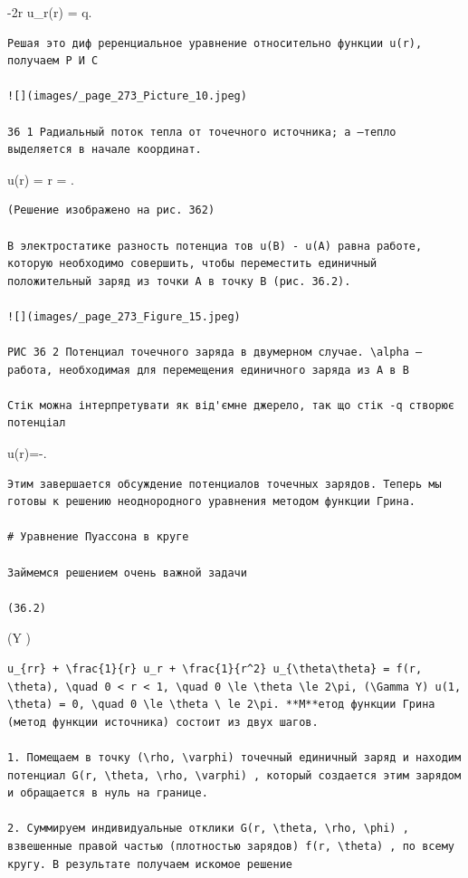 \documentclass[
  ukrainian,
]{article}
\begin{document}
-2\pi r u\_r(r) = q.

\begin{verbatim}
Решая это диф реренциальное уравнение относительно функции u(r), получаем Р И С

![](images/_page_273_Picture_10.jpeg)

36 1 Радиальный поток тепла от точечного источника; a —тепло выделяется в начале координат.
\end{verbatim}

u(r) =  \ln r =  \ln {}.

\begin{verbatim}
(Решение изображено на рис. 362)

В электростатике разность потенциа тов u(B) - u(A) равна работе, которую необходимо совершить, чтобы переместить единичный положительный заряд из точки A в точку B (рис. 36.2).

![](images/_page_273_Figure_15.jpeg)

РИС 36 2 Потенциал точечного заряда в двумерном случае. \alpha — работа, необходимая для перемещения единичного заряда из A в B

Стік можна інтерпретувати як від'ємне джерело, так що стік -q створює потенціал
\end{verbatim}

u\left(r\right)=-\ln{}.

\begin{verbatim}
Этим завершается обсуждение потенциалов точечных зарядов. Теперь мы готовы к решению неоднородного уравнения методом функции Грина.

# Уравнение Пуассона в круге

Займемся решением очень важной задачи

(36.2)
\end{verbatim}

(Y \cup \Pi)

\begin{verbatim}
u_{rr} + \frac{1}{r} u_r + \frac{1}{r^2} u_{\theta\theta} = f(r, \theta), \quad 0 < r < 1, \quad 0 \le \theta \le 2\pi, (\Gamma Y) u(1, \theta) = 0, \quad 0 \le \theta \ le 2\pi. **М**етод функции Грина (метод функции источника) состоит из двух шагов.

1. Помещаем в точку (\rho, \varphi) точечный единичный заряд и находим потенциал G(r, \theta, \rho, \varphi) , который создается этим зарядом и обращается в нуль на границе.

2. Суммируем индивидуальные отклики G(r, \theta, \rho, \phi) , взвешенные правой частью (плотностью зарядов) f(r, \theta) , по всему кругу. В результате получаем искомое решение
\end{verbatim}
\end{document}
